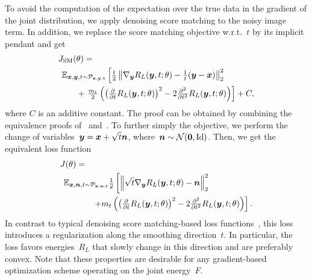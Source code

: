 \documentclass{article}
\newcommand{\id}{\mathrm{Id}}
\newcommand{\norm}[1]{\left\Vert#1\right\Vert}
\renewcommand{\vec}[1]{\mathbf{#1}}
\newcommand{\dist}[1]{\mathcal{P}_{#1}}
\theoremstyle{plain}
\theoremstyle{definition}
\theoremstyle{remark}
\begin{document}
To avoid the computation of the expectation over the true data in the gradient of the joint distribution, we apply denoising score matching to the noisy image term.
In addition, we replace the score matching objective w.r.t.~$t$ by its implicit pendant and get
\begin{align*}
&J_\mathrm{SM}(\theta)=\\
&\hspace{1ex}\E_{\vx,\vy,t\sim\dist{\rvx,\rvy,\rt}}\left[\tfrac{t}{2}\norm{\nabla_\vy R_L(\vy,t;\theta) -\tfrac{1}{t}(\vy-\vx)}_2^2 \right.\\
&\hspace{5ex}+ \left. \tfrac{m_t}{2}\left(\left(\tfrac{\partial}{\partial t}R_L(\vy,t;\theta)\right)^2 -2\tfrac{\partial^2}{\partial t^2}R_L(\vy,t;\theta)\right)\right] + C,
\end{align*}
where $C$ is an additive constant.
The proof can be obtained by combining the equivalence proofs of~\citet{Hy05} and~\citet{Vi11}.
To further simply the objective, we perform the change of variables~${\bm{y}}={\bm{x}}+\sqrt{t}{\bm{n}}$, where~$\vn\sim\mathcal{N}(\vec{0},\id)$.
Then, we get the equivalent loss function
\begin{align} \label{eq:loss}
&J(\theta)=\\
&\hspace{1ex}\E_{\vx,\vn,t\sim\dist{\rvx,\rvn,\rt}}\tfrac{1}{2}\left[\norm{\sqrt{t}\nabla_\vy R_L(\vy,t;\theta) -\vn}_2^2\right. \notag\\ 
&\hspace{9ex}\left.+m_t\left(\left(\tfrac{\partial}{\partial t}R_L(\vy,t;\theta)\right)^2 -2\tfrac{\partial^2}{\partial t^2}R_L(\vy,t;\theta)\right)\right]. \notag
\end{align}
In contrast to typical denoising score matching-based loss functions~\citep{SoEr19,HoJa20}, this loss introduces a regularization along the smoothing direction~$t$.
In particular, the loss favors energies~$R_L$ that slowly change in this direction and are preferably convex.
Note that these properties are desirable for any gradient-based optimization scheme operating on the joint energy~$F$.
\end{document}
